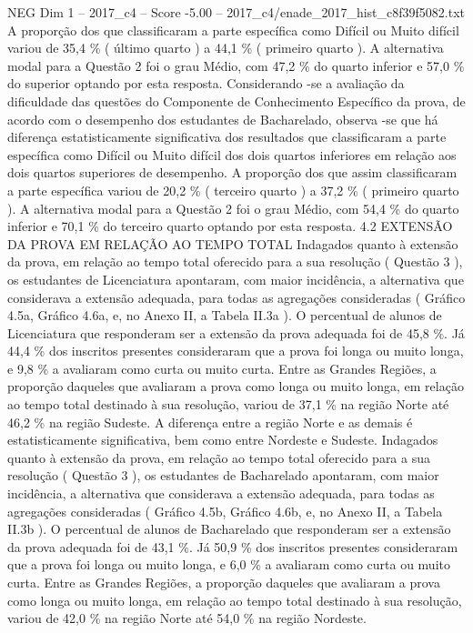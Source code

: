 \begin{textsample}{NEG Dim 1 – 2017\_c4 – Score -5.00 – 2017\_c4/enade\_2017\_hist\_c8f39f5082.txt}
A proporção dos que classificaram a parte específica como Difícil ou Muito difícil variou de 35,4 \% ( último quarto ) a 44,1 \% ( primeiro quarto ).
A alternativa modal para a Questão 2 foi o grau Médio, com 47,2 \% do quarto inferior e 57,0 \% do superior optando por esta resposta.
Considerando -se a avaliação da dificuldade das questões do Componente de Conhecimento Específico da prova, de acordo com o desempenho dos estudantes de Bacharelado, observa -se que há diferença estatisticamente significativa dos resultados que classificaram a parte específica como Difícil ou Muito difícil dos dois quartos inferiores em relação aos dois quartos superiores de desempenho.
A proporção dos que assim classificaram a parte específica variou de 20,2 \% ( terceiro quarto ) a 37,2 \% ( primeiro quarto ).
A alternativa modal para a Questão 2 foi o grau Médio, com 54,4 \% do quarto inferior e 70,1 \% do terceiro quarto optando por esta resposta. 4.2 EXTENSÃO DA PROVA EM RELAÇÃO AO TEMPO TOTAL Indagados quanto à extensão da prova, em relação ao tempo total oferecido para a sua resolução ( Questão 3 ), os estudantes de Licenciatura apontaram, com maior incidência, a alternativa que considerava a extensão adequada, para todas as agregações consideradas ( Gráfico 4.5a, Gráfico 4.6a, e, no Anexo II, a Tabela II.3a ).
O percentual de alunos de Licenciatura que responderam ser a extensão da prova adequada foi de 45,8 \%.
Já 44,4 \% dos inscritos presentes consideraram que a prova foi longa ou muito longa, e 9,8 \% a avaliaram como curta ou muito curta.
Entre as Grandes Regiões, a proporção daqueles que avaliaram a prova como longa ou muito longa, em relação ao tempo total destinado à sua resolução, variou de 37,1 \% na região Norte até 46,2 \% na região Sudeste.
A diferença entre a região Norte e as demais é estatisticamente significativa, bem como entre Nordeste e Sudeste.
Indagados quanto à extensão da prova, em relação ao tempo total oferecido para a sua resolução ( Questão 3 ), os estudantes de Bacharelado apontaram, com maior incidência, a alternativa que considerava a extensão adequada, para todas as agregações consideradas ( Gráfico 4.5b, Gráfico 4.6b, e, no Anexo II, a Tabela II.3b ).
O percentual de alunos de Bacharelado que responderam ser a extensão da prova adequada foi de 43,1 \%.
Já 50,9 \% dos inscritos presentes consideraram que a prova foi longa ou muito longa, e 6,0 \% a avaliaram como curta ou muito curta.
Entre as Grandes Regiões, a proporção daqueles que avaliaram a prova como longa ou muito longa, em relação ao tempo total destinado à sua resolução, variou de 42,0 \% na região Norte até 54,0 \% na região Nordeste.

\end{textsample}
